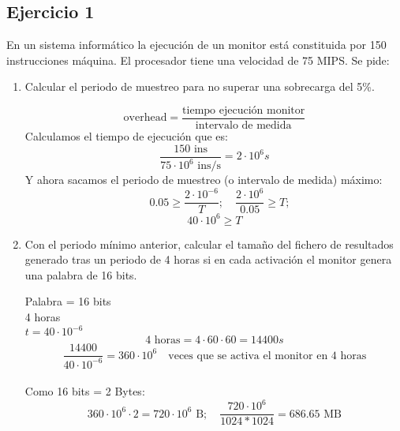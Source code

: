 \subsection{Ejercicio 1}
\noindent
En un sistema informático la ejecución de un monitor está constituida por 150 instrucciones máquina. El procesador tiene una velocidad de 75 MIPS. Se pide:
\begin{enumerate}
    \item Calcular el periodo de muestreo para no superar una sobrecarga del 5\%.
\begin{tcolorbox}[colback=white,colframe=cyan!50!black,fonttitle=\bfseries]
\[
\text{overhead}=\dfrac{\text{tiempo ejecución monitor}}{\text{intervalo de medida}}
\]
Calculamos el tiempo de ejecución que es:
\[
\dfrac{150\text{ ins}}{75\cdot 10^6\text{ ins/s}}=2\cdot 10^6 s
\]
Y ahora sacamos el periodo de muestreo (o intervalo de medida) máximo:
\[\quad 0.05\geq \dfrac{2\cdot 10^{-6}}{T}; \quad \dfrac{2\cdot 10^6}{0.05}\geq T;\]
\[
40\cdot 10^6\geq T
\]
\end{tcolorbox}    
    \item Con el periodo mínimo anterior, calcular el tamaño del fichero de resultados generado tras un periodo de 4 horas si en cada activación el monitor genera una palabra de 16 bits.
\begin{tcolorbox}[colback=white,colframe=cyan!50!black,fonttitle=\bfseries]
Palabra = 16 bits\\
4 horas\\
$t=40\cdot 10^{-6}$
\[
4\text{ horas}=4\cdot 60\cdot 60=14400s
\]
\[
\dfrac{14400}{40\cdot 10^{-6}}=360\cdot 10^6 \quad\text{veces que se activa el monitor en 4 horas}
\]\\
Como 16 bits = 2 Bytes:
\[
360\cdot 10^6\cdot 2 = 720 \cdot 10^6\text{ B}; \quad \dfrac{720 \cdot 10^6}{1024*1024}=686.65\text{ MB}
\]
\end{tcolorbox}    
\end{enumerate}
